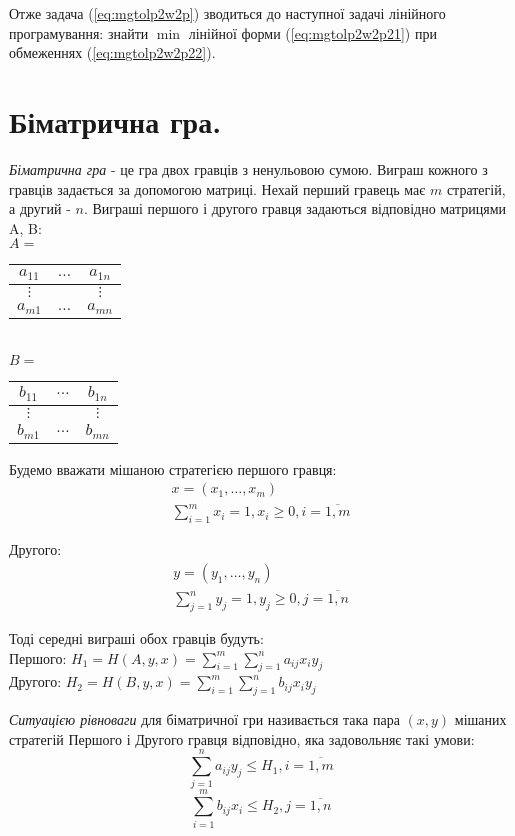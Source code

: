 \documentclass[12pt,a4paper]{book}
\begin{document}
Отже задача (\ref{eq:mgtolp2w2p}) зводиться до наступної задачі лінійного програмування: знайти $\min$ лінійної форми (\ref{eq:mgtolp2w2p21}) при обмеженнях (\ref{eq:mgtolp2w2p22}).

\section{Біматрична гра.}

\emph{Біматрична гра} - це гра двох гравців з ненульовою сумою. Виграш кожного з гравців задається за допомогою матриці. Нехай перший гравець має $m$ стратегій, а другий - $n$. Виграші першого і другого гравця задаються відповідно матрицями A, B:\\
$A =$
\begin{tabular}{|c|c|c|}
\hline
$a_{1 1}$&$\dots$&$a_{1 n}$\\
\hline
$\vdots$&&$\vdots$\\
\hline
$a_{m 1}$&$\dots$&$a_{m n}$\\
\hline
\end{tabular}\\
$B =$
\begin{tabular}{|c|c|c|}
\hline
$b_{1 1}$&$\dots$&$b_{1 n}$\\
\hline
$\vdots$&&$\vdots$\\
\hline
$b_{m 1}$&$\dots$&$b_{m n}$\\
\hline
\end{tabular}

Будемо вважати мішаною стратегією першого гравця:
\[\begin{array}{l}
x = (x_1, \dots, x_m)\\
\sum_{i=1}^m x_i = 1, x_i \ge 0, i = \overline{1,m}
\end{array}\]

Другого:
\[\begin{array}{l}
y = (y_1, \dots, y_n)\\
\sum_{j=1}^n y_j = 1, y_j \ge 0, j = \overline{1,n}
\end{array}\]

Тоді середні виграші обох гравців будуть:\\
Першого: $\displaystyle H_1=H(A,y,x)=\sum_{i=1}^m \sum_{j=1}^n a_{ij} x_i y_j$\\
Другого: $\displaystyle H_2=H(B,y,x)=\sum_{i=1}^m \sum_{j=1}^n b_{ij} x_i y_j$

\emph{Ситуацією рівноваги} для біматричної гри називається така пара $(x,y)$ мішаних стратегій Першого і Другого гравця відповідно, яка задовольняє такі умови:
\begin{equation} \sum_{j=1}^n a_{ij} y_j \le H_1, i=\overline{1,m} \label{eq:bimatrbalance1}\end{equation}
\begin{equation} \sum_{i=1}^m b_{ij} x_i \le H_2, j=\overline{1,n} \label{eq:bimatrbalance2}\end{equation}
\end{document}
